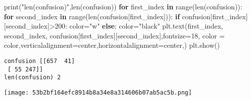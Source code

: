 \documentclass[
]{article}
\newenvironment{Shaded}{}{}
\newcommand{\BuiltInTok}[1]{#1}
\newcommand{\ControlFlowTok}[1]{\textcolor[rgb]{0.00,0.44,0.13}{\textbf{#1}}}
\newcommand{\DecValTok}[1]{\textcolor[rgb]{0.25,0.63,0.44}{#1}}
\newcommand{\KeywordTok}[1]{\textcolor[rgb]{0.00,0.44,0.13}{\textbf{#1}}}
\newcommand{\NormalTok}[1]{#1}
\newcommand{\OperatorTok}[1]{\textcolor[rgb]{0.40,0.40,0.40}{#1}}
\newcommand{\StringTok}[1]{\textcolor[rgb]{0.25,0.44,0.63}{#1}}
\begin{document}
\begin{Shaded}
\begin{Highlighting}[]
\BuiltInTok{print}\NormalTok{(}\StringTok{"len(confusion)"}\NormalTok{,}\BuiltInTok{len}\NormalTok{(confusion))}
\ControlFlowTok{for}\NormalTok{ first\_index }\KeywordTok{in} \BuiltInTok{range}\NormalTok{(}\BuiltInTok{len}\NormalTok{(confusion)):}
    \ControlFlowTok{for}\NormalTok{ second\_index }\KeywordTok{in} \BuiltInTok{range}\NormalTok{(}\BuiltInTok{len}\NormalTok{(confusion[first\_index])):}
        \ControlFlowTok{if}\NormalTok{ confusion[first\_index][second\_index]}\OperatorTok{\textgreater{}}\DecValTok{200}\NormalTok{:}
\NormalTok{            color}\OperatorTok{=}\StringTok{"w"}
        \ControlFlowTok{else}\NormalTok{:}
\NormalTok{            color}\OperatorTok{=}\StringTok{"black"}
\NormalTok{        plt.text(first\_index, second\_index, confusion[first\_index][second\_index],fontsize}\OperatorTok{=}\DecValTok{18}\NormalTok{, color }\OperatorTok{=}\NormalTok{ color,verticalalignment}\OperatorTok{=}\StringTok{\textquotesingle{}center\textquotesingle{}}\NormalTok{,horizontalalignment}\OperatorTok{=}\StringTok{\textquotesingle{}center\textquotesingle{}}\NormalTok{,)}
\NormalTok{plt.show()}

\end{Highlighting}
\end{Shaded}

\begin{verbatim}
confusion [[657  41]
 [ 55 247]]
len(confusion) 2
\end{verbatim}

\texttt{[image: 53b2bf164efc8914b8a34e8a314606b07ab5ac5b.png]}

\begin{Shaded}
\begin{Highlighting}[]

\end{Highlighting}
\end{Shaded}

\begin{Shaded}
\begin{Highlighting}[]

\end{Highlighting}
\end{Shaded}

\begin{Shaded}
\begin{Highlighting}[]

\end{Highlighting}
\end{Shaded}
\end{document}
